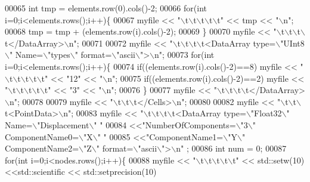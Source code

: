 \begin{DoxyCode}
00065     \textcolor{keywordtype}{int} tmp = elements.row(0).cols()-2;
00066     \textcolor{keywordflow}{for}(\textcolor{keywordtype}{int} i=0;i<elements.rows();i++)\{
00067             myfile << \textcolor{stringliteral}{"\(\backslash\)t\(\backslash\)t\(\backslash\)t\(\backslash\)t\(\backslash\)t"} << tmp << \textcolor{stringliteral}{"\(\backslash\)n"};
00068             tmp = tmp + (elements.row(i).cols()-2);
00069     \}
00070     myfile << \textcolor{stringliteral}{"\(\backslash\)t\(\backslash\)t\(\backslash\)t\(\backslash\)t</DataArray>\(\backslash\)n"};
00071 
00072     myfile << \textcolor{stringliteral}{"\(\backslash\)t\(\backslash\)t\(\backslash\)t\(\backslash\)t<DataArray type=\(\backslash\)"UInt8\(\backslash\)" Name=\(\backslash\)"types\(\backslash\)" format=\(\backslash\)"ascii\(\backslash\)">\(\backslash\)n"};
00073     \textcolor{keywordflow}{for}(\textcolor{keywordtype}{int} i=0;i<elements.rows();i++)\{
00074         \textcolor{keywordflow}{if}((elements.row(i).cols()-2)==8) myfile << \textcolor{stringliteral}{"\(\backslash\)t\(\backslash\)t\(\backslash\)t\(\backslash\)t\(\backslash\)t"} << \textcolor{stringliteral}{"12"} << \textcolor{stringliteral}{"\(\backslash\)n"};
00075         \textcolor{keywordflow}{if}((elements.row(i).cols()-2)==2) myfile << \textcolor{stringliteral}{"\(\backslash\)t\(\backslash\)t\(\backslash\)t\(\backslash\)t\(\backslash\)t"} << \textcolor{stringliteral}{"3"} << \textcolor{stringliteral}{"\(\backslash\)n"};
00076     \}
00077     myfile << \textcolor{stringliteral}{"\(\backslash\)t\(\backslash\)t\(\backslash\)t\(\backslash\)t</DataArray>\(\backslash\)n"};
00078 
00079     myfile << \textcolor{stringliteral}{"\(\backslash\)t\(\backslash\)t\(\backslash\)t</Cells>\(\backslash\)n"};
00080 
00082     myfile << \textcolor{stringliteral}{"\(\backslash\)t\(\backslash\)t\(\backslash\)t<PointData>\(\backslash\)n"};
00083     myfile << \textcolor{stringliteral}{"\(\backslash\)t\(\backslash\)t\(\backslash\)t\(\backslash\)t<DataArray type=\(\backslash\)"Float32\(\backslash\)" Name=\(\backslash\)"Displacement\(\backslash\)" "}
00084         <<\textcolor{stringliteral}{"NumberOfComponents=\(\backslash\)"3\(\backslash\)" ComponentName0=\(\backslash\)"X\(\backslash\)" "}
00085         <<\textcolor{stringliteral}{"ComponentName1=\(\backslash\)"Y\(\backslash\)" ComponentName2=\(\backslash\)"Z\(\backslash\)" format=\(\backslash\)"ascii\(\backslash\)">\(\backslash\)n"} ;
00086     \textcolor{keywordtype}{int} num = 0;
00087     \textcolor{keywordflow}{for}(\textcolor{keywordtype}{int} i=0;i<nodes.rows();i++)\{
00088         myfile << \textcolor{stringliteral}{"\(\backslash\)t\(\backslash\)t\(\backslash\)t\(\backslash\)t\(\backslash\)t"} << std::setw(10)<<std::scientific << std::setprecision(10)

\end{DoxyCode}
